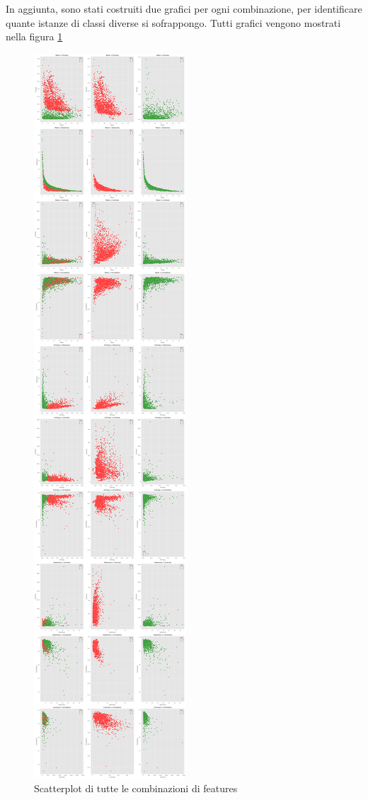 In aggiunta, sono stati costruiti due grafici per ogni combinazione, per identificare
quante istanze di classi diverse si sofrappongo. Tutti grafici vengono mostrati nella figura
\ref{fig:scatterplot_features}

\newpage

\begin{figure}[!h]
      \centering
      \includegraphics[height=\textheight]{img/analisi/scatterplot.png}
      \caption{Scatterplot di tutte le combinazioni di features}
      \label{fig:scatterplot_features}
\end{figure}


